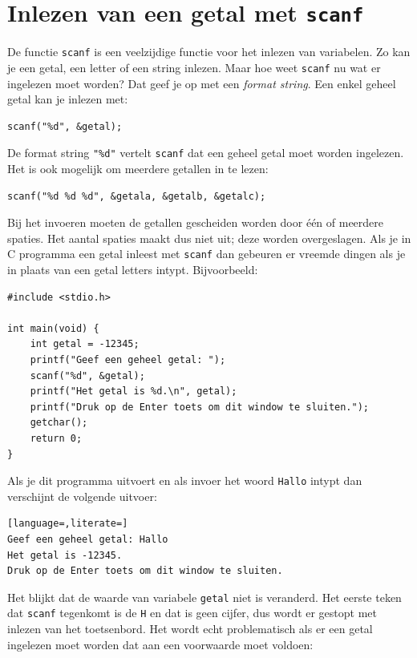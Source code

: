 \documentclass[a4paper,10pt,fleqn,twoside]{article}
\begin{document}
\section{Inlezen van een getal met \texttt{scanf}}
\label{sec:scanf}
De functie \lstinline|scanf| is een veelzijdige functie voor het inlezen van variabelen. Zo kan je een getal, een letter of een string inlezen. Maar hoe weet \lstinline|scanf| nu wat er ingelezen moet worden? Dat geef je op met een \textsl{format string}. Een enkel geheel getal kan je inlezen met:

\begin{lstlisting}
scanf("%d", &getal);
\end{lstlisting}

De format string \lstinline|"%d"| vertelt \lstinline|scanf| dat een geheel getal moet worden ingelezen. Het is ook mogelijk om meerdere getallen in te lezen:

\begin{lstlisting}
scanf("%d %d %d", &getala, &getalb, &getalc);
\end{lstlisting}

Bij het invoeren moeten de getallen gescheiden worden door \'e\'en of meerdere spaties. Het aantal spaties maakt dus niet uit; deze worden overgeslagen. Als je in C programma een getal inleest met \lstinline|scanf| dan gebeuren er vreemde dingen als je in plaats van een getal letters intypt. Bijvoorbeeld:

\begin{lstlisting}
#include <stdio.h>

int main(void) {
    int getal = -12345;
    printf("Geef een geheel getal: ");
    scanf("%d", &getal);
    printf("Het getal is %d.\n", getal);
    printf("Druk op de Enter toets om dit window te sluiten.");
    getchar();
    return 0;
}
\end{lstlisting}

Als je dit programma uitvoert en als invoer het woord \lstinline|Hallo| intypt dan verschijnt de volgende uitvoer:

\begin{lstlisting}[language=,literate=]
Geef een geheel getal: Hallo
Het getal is -12345.
Druk op de Enter toets om dit window te sluiten.
\end{lstlisting}

Het blijkt dat de waarde van variabele \lstinline|getal| niet is veranderd. Het eerste teken dat \lstinline|scanf| tegenkomt is de \lstinline|H| en dat is geen cijfer, dus wordt er gestopt met inlezen van het toetsenbord. Het wordt echt problematisch als er een getal ingelezen moet worden dat aan een voorwaarde moet voldoen:
\end{document}
